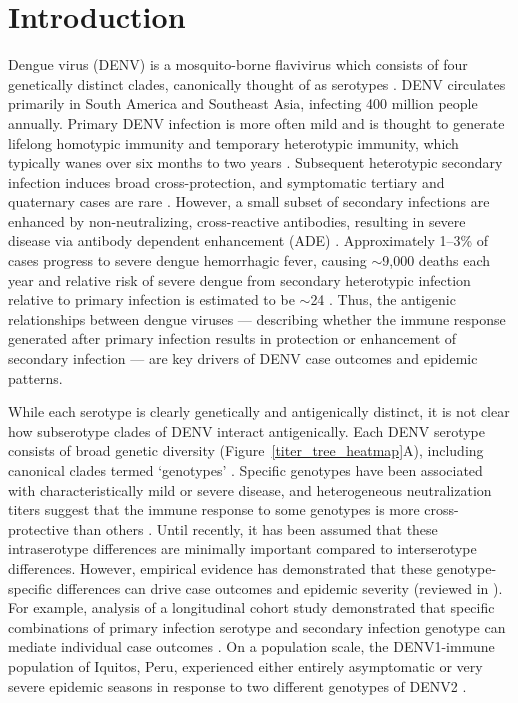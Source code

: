 \documentclass[11pt,oneside,letterpaper]{article}
\begin{document}
\section*{Introduction}
Dengue virus (DENV) is a mosquito-borne flavivirus which consists of four genetically distinct clades, canonically thought of as serotypes \citep{lanciotti1997molecular}.
DENV circulates primarily in South America and Southeast Asia, infecting 400 million people annually.
Primary DENV infection is more often mild and is thought to generate lifelong homotypic immunity and temporary heterotypic immunity, which typically wanes over six months to two years \citep{sabin1952research,reich2013interactions,katzelnick2016neutralizing}.
Subsequent heterotypic secondary infection induces broad cross-protection, and symptomatic tertiary and quaternary cases are rare  \citep{gibbons2007analysis,olkowski2013reduced}.
However, a small subset of secondary infections are enhanced by non-neutralizing, cross-reactive antibodies, resulting in severe disease via antibody dependent enhancement (ADE) \citep{halstead1979vivo,katzelnick2017antibody,sangkawibha1984risk,salje2018reconstruction}.
Approximately 1--3\% of cases progress to severe dengue hemorrhagic fever, causing $\sim$9,000 deaths each year \cite{bhatt2013global,stanaway2016global} and relative risk of severe dengue from secondary heterotypic infection relative to primary infection is estimated to be $\sim$24 \citep{mizumoto2014risk}.
Thus, the antigenic relationships between dengue viruses --- describing whether the immune response generated after primary infection results in protection or enhancement of secondary infection --- are key drivers of DENV case outcomes and epidemic patterns.

While each serotype is clearly genetically and antigenically distinct, it is not clear how subserotype clades of DENV interact antigenically.
Each DENV serotype consists of broad genetic diversity (Figure~\ref{titer_tree_heatmap}A), including canonical clades termed `genotypes'  \citep{rico1990molecular,twiddy2003inferring}.
Specific genotypes have been associated with characteristically mild or severe disease, and heterogeneous neutralization titers suggest that the immune response to some genotypes is more cross-protective than others \citep{gentry1982identification,russell1967dengue}.
Until recently, it has been assumed that these intraserotype differences are minimally important compared to interserotype differences.
However, empirical evidence has demonstrated that these genotype-specific differences can drive case outcomes and epidemic severity (reviewed in \citet{holmes2003origin}).
For example, analysis of a longitudinal cohort study demonstrated that specific combinations of primary infection serotype and secondary infection genotype can mediate individual case outcomes \citep{ohainle2011dynamics}.
On a population scale, the DENV1-immune population of Iquitos, Peru, experienced either entirely asymptomatic or very severe epidemic seasons in response to two different genotypes of DENV2 \citep{kochel2002effect}.
\end{document}
